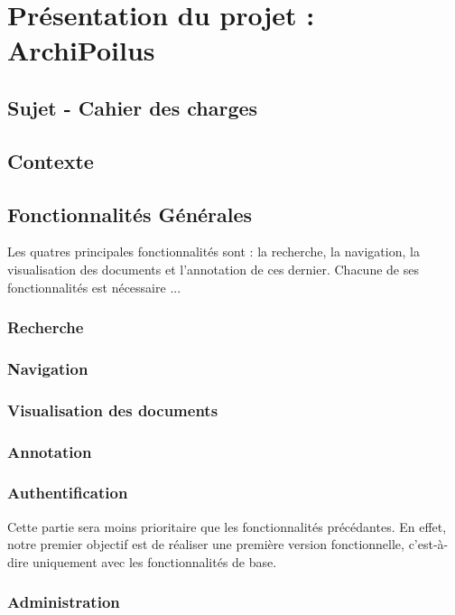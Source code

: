 \documentclass[a4paper]{article}
\begin{document}
\section{Présentation du projet : ArchiPoilus}

\subsection{Sujet - Cahier des charges}

\subsection{Contexte}

\subsection{Fonctionnalités Générales}

	Les quatres principales fonctionnalités sont : la recherche, la navigation, la visualisation des documents et l'annotation de ces dernier. Chacune de ses fonctionnalités est nécessaire ...

\subsubsection{Recherche}
\subsubsection{Navigation}
\subsubsection{Visualisation des documents}
\subsubsection{Annotation}

\subsubsection{Authentification}

	Cette partie sera moins prioritaire que les fonctionnalités précédantes. En effet, notre premier objectif est de réaliser une première version fonctionnelle, c'est-à-dire uniquement avec les fonctionnalités de base.

\subsubsection{Administration}
\end{document}
